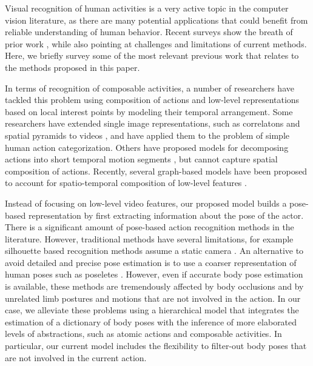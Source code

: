 Visual recognition of human activities is a very active topic in the computer vision
literature, as there are many potential applications that could benefit from
reliable understanding of human behavior. Recent surveys show the breath
of prior work \cite{Aggarwal2011,vishwakarma2013survey,weinland2011survey},
while also pointing at challenges and limitations of current methods. Here,
we briefly survey some of the most relevant previous work that relates
to the methods proposed in this paper.

In terms of recognition of composable activities, a number of researchers have tackled this problem 
using composition of actions and low-level representations based on local interest points 
\cite{Dollar2005,Laptev2005} by modeling their temporal arrangement. Some researchers have extended 
single image representations, such as correlatons \cite{Savarese2006} and spatial pyramids 
\cite{Lazebnik:Schmid:Ponce:2006} to videos \cite{Laptev2008}, and have applied them to the problem 
of simple human action categorization. Others have proposed models for decomposing actions into 
short temporal motion segments \cite{Gaidon2013,Niebles2010a}, but cannot capture spatial 
composition of actions. Recently, several graph-based models have been proposed to account for 
spatio-temporal composition of low-level features \cite{Amer2012,Brendel2010,Brendel2011}.

Instead of focusing on low-level video features, our proposed model builds
a pose-based representation by first extracting information about
the pose of the actor. There is a significant amount of pose-based action
recognition methods in the literature. However, traditional methods
have several limitations, for example silhouette based recognition methods
assume a static camera \cite{Bobick2001,Thurau2008}. An alternative to avoid
detailed and precise pose estimation is to use a
coarser representation of human poses such as poseletes \cite{Bourdev2009,raptis2013poselet}.
However, even if accurate body pose estimation
is available, these methods are tremendously affected by body occlusions
and by unrelated limb postures and motions that are not involved in the
action. In our case, we alleviate these problems using a hierarchical model that
integrates the estimation of a dictionary of body poses with the inference of more elaborated
levels of abstractions, such as atomic actions and composable
activities. In particular, our current model includes the flexibility 
to filter-out body poses that are not involved in the current action.

